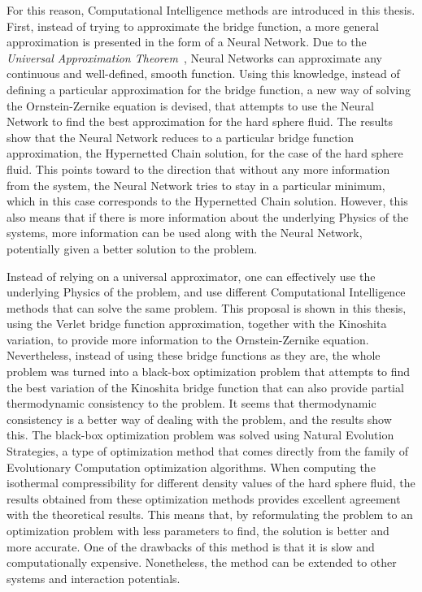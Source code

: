 For this reason, Computational Intelligence methods are introduced in this thesis. First, 
instead of trying to approximate the bridge function, a more general approximation is 
presented in the form of a Neural Network. Due to the 
\emph{Universal Approximation Theorem}~\cite{hornikMultilayerFeedforwardNetworks1989,hornikApproximationCapabilitiesMultilayer1991,cybenkoApproximationSuperpositionsSigmoidal1989}, 
Neural Networks can approximate any continuous and well-defined, smooth function. Using 
this knowledge, instead of defining a particular approximation for the bridge function, a 
new way of solving the Ornstein-Zernike equation is devised, that attempts to use the 
Neural Network to find the best approximation for the hard sphere fluid. The results show 
that the Neural Network reduces to a particular bridge function approximation, the 
Hypernetted Chain solution, for the case of the hard sphere fluid. This points toward to 
the direction that without any more information from the system, the Neural Network tries 
to stay in a particular minimum, which in this case corresponds to the Hypernetted Chain 
solution. However, this also means that if there is more information about the underlying 
Physics of the systems, more information can be used along with the Neural Network, 
potentially given a better solution to the problem.

Instead of relying on a universal approximator, one can effectively use the underlying 
Physics of the problem, and use different Computational Intelligence methods that can solve 
the same problem. This proposal is shown in this thesis, using the Verlet bridge function 
approximation, together with the Kinoshita variation, to provide more information to the 
Ornstein-Zernike equation. Nevertheless, instead of using these bridge functions as they 
are, the whole problem was turned into a black-box optimization problem that attempts to 
find the best variation of the Kinoshita bridge function that can also provide partial 
thermodynamic consistency to the problem. It seems that thermodynamic consistency is a 
better way of dealing with the problem, and the results show this. The black-box 
optimization problem was solved using Natural Evolution Strategies, a type of optimization 
method that comes directly from the family of Evolutionary Computation optimization 
algorithms. When computing the isothermal compressibility for different density values of 
the hard sphere fluid, the results obtained from these optimization methods provides 
excellent agreement with the theoretical results. This means that, by reformulating the 
problem to an optimization problem with less parameters to find, the solution is better and 
more accurate. One of the drawbacks of this method is that it is slow and computationally 
expensive. Nonetheless, the method can be extended to other systems and interaction 
potentials.

